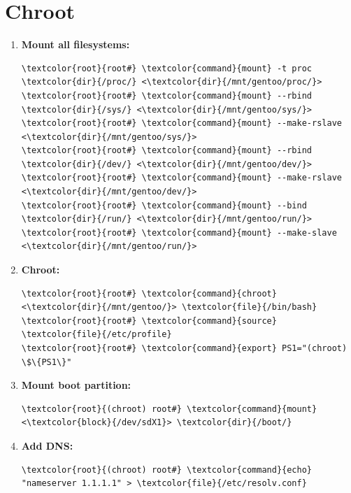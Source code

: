\documentclass[10pt, a4paper, onecolumn, oneside, titlepage, openany]{book}
\begin{document}
\section{Chroot}
\begin{enumerate}
    \item \textbf{Mount all filesystems:}
\begin{Verbatim}[commandchars=\\\{\}]
\textcolor{root}{root#} \textcolor{command}{mount} -t proc \textcolor{dir}{/proc/} <\textcolor{dir}{/mnt/gentoo/proc/}>
\textcolor{root}{root#} \textcolor{command}{mount} --rbind \textcolor{dir}{/sys/} <\textcolor{dir}{/mnt/gentoo/sys/}>
\textcolor{root}{root#} \textcolor{command}{mount} --make-rslave <\textcolor{dir}{/mnt/gentoo/sys/}>
\textcolor{root}{root#} \textcolor{command}{mount} --rbind \textcolor{dir}{/dev/} <\textcolor{dir}{/mnt/gentoo/dev/}>
\textcolor{root}{root#} \textcolor{command}{mount} --make-rslave <\textcolor{dir}{/mnt/gentoo/dev/}>
\textcolor{root}{root#} \textcolor{command}{mount} --bind \textcolor{dir}{/run/} <\textcolor{dir}{/mnt/gentoo/run/}>
\textcolor{root}{root#} \textcolor{command}{mount} --make-slave <\textcolor{dir}{/mnt/gentoo/run/}>
\end{Verbatim}
    \item \textbf{Chroot:}
\begin{Verbatim}[commandchars=\\\{\}]
\textcolor{root}{root#} \textcolor{command}{chroot} <\textcolor{dir}{/mnt/gentoo/}> \textcolor{file}{/bin/bash}
\textcolor{root}{root#} \textcolor{command}{source} \textcolor{file}{/etc/profile}
\textcolor{root}{root#} \textcolor{command}{export} PS1="(chroot) \$\{PS1\}"
\end{Verbatim}
    \item \textbf{Mount boot partition:}
\begin{Verbatim}[commandchars=\\\{\}]
\textcolor{root}{(chroot) root#} \textcolor{command}{mount} <\textcolor{block}{/dev/sdX1}> \textcolor{dir}{/boot/}
\end{Verbatim}
    \item \textbf{Add DNS:}
\begin{Verbatim}[commandchars=\\\{\}]
\textcolor{root}{(chroot) root#} \textcolor{command}{echo} "nameserver 1.1.1.1" > \textcolor{file}{/etc/resolv.conf}
\end{Verbatim}
\end{enumerate}
\end{document}
